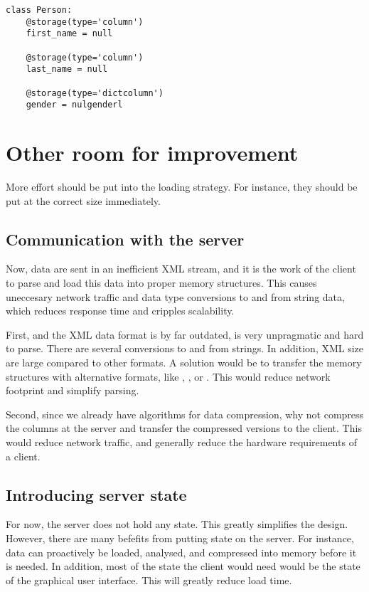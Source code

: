 \begin{lstlisting}
class Person:
    @storage(type='column')
    first_name = null

    @storage(type='column')
    last_name = null

    @storage(type='dictcolumn')
    gender = nulgenderl
\end{lstlisting}


\section{Other room for improvement}
\label{sec: Other room for improvement}
More effort should be put into the loading strategy. For instance, they should be put at the correct size immediately.

\subsection{Communication with the server}
\label{sub:Compressing data at the server}
Now, data are sent in an inefficient XML stream, and it is the work of the client to parse and load this data into proper memory structures. This causes uneccesary network traffic and data type conversions to and from string data, which reduces response time and cripples scalability.

First, and the XML data format is by far outdated, is very unpragmatic and hard to parse. There are several conversions to and from strings. In addition, XML size are large compared to other formats. A solution would be to transfer the memory structures with alternative formats, like , , or . This would reduce network footprint and simplify parsing. 

Second, since we already have algorithms for data compression, why not compress the columns at the server and transfer the compressed versions to the client. This would reduce network traffic, and generally reduce the hardware requirements of a client.

\subsection{Introducing server state}
\label{sub:Introducing server state}
For now, the server does not hold any state. This greatly simplifies the design. However, there are many befefits from putting state on the server. For instance, data can proactively be loaded, analysed, and compressed into memory before it is needed. In addition, most of the state the client would need would be the state of the graphical user interface. This will greatly reduce load time. 

